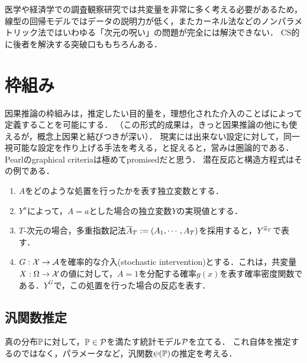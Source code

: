\documentclass[uplatex,dvipdfmx]{jsreport}
\begin{document}
\begin{history}[セミパラメトリックモデル]
    医学や経済学での調査観察研究では共変量を非常に多く考える必要があるため，線型の回帰モデルではデータの説明力が低く，またカーネル法などのノンパラメトリック法ではいわゆる「次元の呪い」の問題が完全には解決できない．
    CS的に後者を解決する突破口ももちろんある．
\end{history}

\section{枠組み}

\begin{tcolorbox}[colframe=ForestGreen, colback=ForestGreen!10!white,breakable,colbacktitle=ForestGreen!40!white,coltitle=black,fonttitle=\bfseries\sffamily,
title=]
    因果推論の枠組みは，推定したい目的量を，理想化された介入のことばによって定義することを可能にする．
    （この形式的成果は，きっと因果推論の他にも使えるが，概念上因果と結びつきが深い）．
    現実には出来ない設定に対して，同一視可能な設定を作り上げる手法を考える，と捉えると，営みは圏論的である．
    Pearlのgraphical criteriaは極めてpromisedだと思う．
    潜在反応と構造方程式はその例である．
\end{tcolorbox}

\begin{notation}\mbox{}
    \begin{enumerate}
        \item $A$をどのような処置を行ったかを表す独立変数とする．
        \item $Y^a$によって，$A=a$とした場合の独立変数$Y$の実現値とする．
        \item $T$-次元の場合，多重指数記法$\o{A}_T:=(A_1,\cdots,A_T)$を採用すると，$Y^{\o{a}_T}$で表す．
        \item $G:\X\to\A$を確率的な介入(stochastic intervention)とする．これは，共変量$X:\Om\to\X$の値に対して，$A=1$を分配する確率$g(x)$を表す確率密度関数である．$Y^G$で，この処置を行った場合の反応を表す．
    \end{enumerate}
\end{notation}

\subsection{汎関数推定}

\begin{notation}
    真の分布$\bP$に対して，$\bP\in\P$を満たす統計モデル$\P$を立てる．
    これ自体を推定するのではなく，パラメータなど，汎関数$\psi(\bP)$の推定を考える．
\end{notation}
\end{document}
